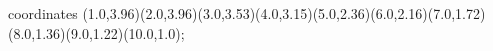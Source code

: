 					coordinates { (1.0,3.96)(2.0,3.96)(3.0,3.53)(4.0,3.15)(5.0,2.36)(6.0,2.16)(7.0,1.72)(8.0,1.36)(9.0,1.22)(10.0,1.0)};